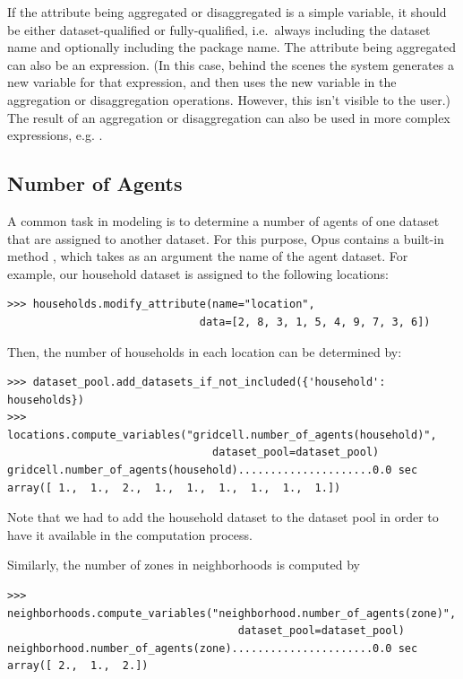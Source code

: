 If the attribute being aggregated or disaggregated is a simple variable, it
should be either dataset-qualified or fully-qualified, i.e.\ always
including the dataset name and optionally including the package name.  The
attribute being aggregated can also be an expression.  (In this case,
behind the scenes the system generates a new variable for that expression,
and then uses the new variable in the aggregation or disaggregation
operations.  However, this isn't visible to the user.)  The result of an
aggregation or disaggregation can also be used in more complex expressions,
e.g. .

\subsection{Number of Agents}

A common task in modeling is to determine a number of agents of one dataset
\datasetindex that are assigned to another dataset. \datasetindex For this
purpose, Opus contains a built-in method , which
takes as an argument the name of the agent dataset. \datasetindex For
example, our household dataset \datasetindex is assigned to the following
locations: \attributesindex
\begin{verbatim}
>>> households.modify_attribute(name="location",
                              data=[2, 8, 3, 1, 5, 4, 9, 7, 3, 6])
\end{verbatim}
Then, the number of households in each location can be determined by:
\variablesindex \attributesindex
\begin{verbatim}
>>> dataset_pool.add_datasets_if_not_included({'household': households})
>>> locations.compute_variables("gridcell.number_of_agents(household)",
                                dataset_pool=dataset_pool)
gridcell.number_of_agents(household).....................0.0 sec
array([ 1.,  1.,  2.,  1.,  1.,  1.,  1.,  1.,  1.])
\end{verbatim}
Note that we had to add the household dataset to the dataset pool 
in order to have it available in the computation process.

Similarly, the number of zones in neighborhoods is computed by
\variablesindex\attributesindex
\begin{verbatim}
>>> neighborhoods.compute_variables("neighborhood.number_of_agents(zone)",
                                    dataset_pool=dataset_pool)
neighborhood.number_of_agents(zone)......................0.0 sec
array([ 2.,  1.,  2.])
\end{verbatim}

